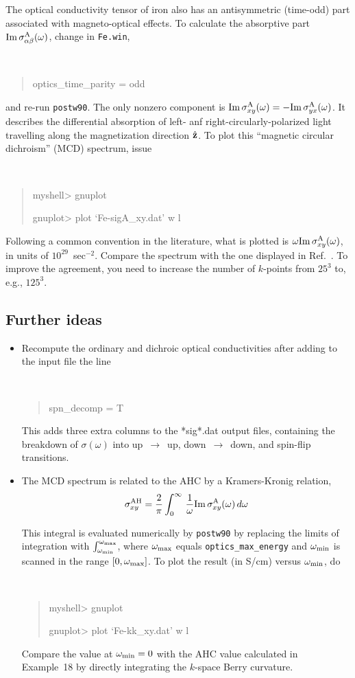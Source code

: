 \documentclass[a4paper,11pt,twoside]{article}
\begin{document}
The optical conductivity tensor of iron also has an antisymmetric
(time-odd) part associated with magneto-optical effects. To calculate
the absorptive part ${\rm Im}\,\sigma^{\rm A}_{\alpha\beta}(\omega)$,
change in {\tt Fe.win},
%
{\tt
\begin{quote}
optics\_time\_parity = odd
\end{quote} }
%
and re-run {\tt postw90}. The only nonzero component is ${\rm
  Im}\,\sigma^{\rm A}_{xy}(\omega)=-{\rm Im}\,\sigma^{\rm
  A}_{yx}(\omega)$.  It describes the differential absorption of left-
anf right-circularly-polarized light travelling along the
magnetization direction $\hat{\bf z}$. To plot this
``magnetic circular dichroism'' (MCD) spectrum, issue
%
{\tt
\begin{quote} myshell> gnuplot

gnuplot> plot `Fe-sigA\_xy.dat' w l
\end{quote} }
%
Following a common convention in the literature, what is plotted is
$\omega{\rm Im}\,\sigma^{\rm A}_{xy}(\omega)$, in units of
$10^{29}$~sec$^{-2}$. Compare the spectrum with the one displayed in
Ref.~\cite{yao-prl04}. To improve the agreement, you need to increase
the number of $k$-points from $25^3$ to, e.g., $125^3$.


\newpage

\subsection*{Further ideas}

\begin{itemize}

\item Recompute the ordinary and dichroic optical conductivities after
  adding to the input file the line
%
{\tt
\begin{quote}

spn\_decomp = T
\end{quote} }
%
This adds three extra columns to the *sig*.dat output files,
containing the breakdown of $\sigma(\omega)$ into
up~$\rightarrow$~up, down~$\rightarrow$~down, and spin-flip
transitions.

\item The MCD spectrum is related to the AHC by a Kramers-Kronig
relation,
%
$$
\sigma^{\rm AH}_{xy}=\frac{2}{\pi}\int_0^\infty\,
\frac{1}{\omega}{\rm Im}\,\sigma^{\rm A}_{xy}(\omega)\,d\omega
$$

This integral is evaluated numerically by {\tt postw90} by replacing
the limits of integration with $\int_{\omega_{\rm min}}^{\omega_{\rm
    max}}$, where $\omega_{\rm max}$ equals {\tt optics\_max\_energy}
and $\omega_{\rm min}$ is scanned in the range $[0,\omega_{\rm
  max}]$. To plot the result (in S/cm) versus $\omega_{\rm min}$, do
%
{\tt
\begin{quote} myshell> gnuplot

gnuplot> plot `Fe-kk\_xy.dat' w l
\end{quote} }
%
Compare the value at $\omega_{\rm min}=0$ with the AHC value
calculated in Example~18 by directly integrating the $k$-space Berry
curvature.

\end{itemize}
\end{document}

